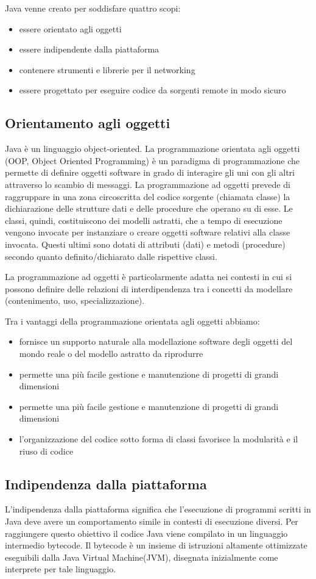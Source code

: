 Java venne creato per soddisfare quattro scopi: 
\begin{itemize}
\item essere orientato agli oggetti
\item essere indipendente dalla piattaforma
\item contenere strumenti e librerie per il networking
\item essere progettato per eseguire codice da sorgenti remote in modo sicuro
\end{itemize}
\subsection*{Orientamento agli oggetti}
Java \`e un linguaggio object-oriented. La programmazione orientata agli oggetti (OOP, Object Oriented Programming) \`e un paradigma di programmazione che permette di definire oggetti software in grado di interagire gli uni con gli altri attraverso lo scambio di messaggi.  
La programmazione ad oggetti prevede di raggruppare in una zona circoscritta del codice sorgente (chiamata classe) la dichiarazione delle strutture dati e delle procedure che operano su di esse. Le classi, quindi, costituiscono dei modelli astratti, che a tempo di esecuzione vengono invocate per instanziare o creare oggetti software relativi alla classe invocata. Questi ultimi sono dotati di attributi (dati) e metodi (procedure) secondo quanto definito/dichiarato dalle rispettive classi.

La programmazione ad oggetti \`e particolarmente adatta nei contesti in cui si possono definire delle relazioni di interdipendenza tra i concetti da modellare (contenimento, uso, specializzazione). 

Tra i vantaggi della programmazione orientata agli oggetti abbiamo:
\begin{itemize}
\item fornisce un supporto naturale alla modellazione software degli oggetti del mondo reale o del modello astratto da riprodurre
\item permette una pi\`u facile gestione e manutenzione di progetti di grandi dimensioni
\item permette una pi\`u facile gestione e manutenzione di progetti di grandi dimensioni
\item l'organizzazione del codice sotto forma di classi favorisce la modularit\`a e il riuso di codice
\end{itemize}
\subsection*{Indipendenza dalla piattaforma}
L'indipendenza dalla piattaforma significa che l’esecuzione di programmi scritti  in  Java  deve  avere  un  comportamento  simile 
in contesti di esecuzione diversi. Per raggiungere questo obiettivo il codice Java viene compilato in un linguaggio intermedio bytecode. Il bytecode \`e un insieme di istruzioni altamente ottimizzate eseguibili dalla Java Virtual Machine(JVM), disegnata inizialmente come interprete per tale linguaggio.


